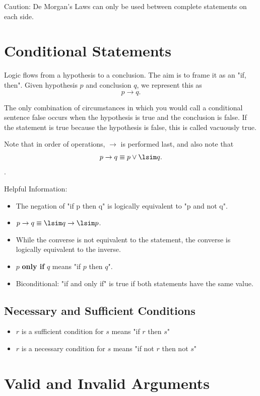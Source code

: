 \documentclass[a4paper]{report}
\begin{document}
Caution: De Morgan's Laws can only be used between complete statements on each side.

\section{Conditional Statements}

Logic flows from a hypothesis to a conclusion. The aim is to frame it as an "if, then". Given hypothesis $p$ and conclusion $q$, we represent this as \[
p \rightarrow q
.\] 

The only combination of circumstances in which you would call a conditional sentence false occurs when the hypothesis is true and the conclusion is false. If the statement is true because the hypothesis is false, this is called vacuously true.

Note that in order of operations, $\to $ is performed last, and also note that \[
p \to q \equiv p \lor \lsim q
.\].

Helpful Information:
\begin{itemize}
    \item The negation of "if p then q" is logically equivalent to "p and not q".
    \item $p \to q \equiv \lsim q \to \lsim p$.
    \item While the converse is not equivalent to the statement, the converse is logically equivalent to the inverse.
    \item $p$ \textbf{only if} $q$ means "if $p$ then $q$".
    \item Biconditional: "if and only if" is true if both statements have the same value.
\end{itemize}

\subsection{Necessary and Sufficient Conditions}

\begin{itemize}
    \item $r$ is a sufficient condition for $s$ means "if $r$ then $s$"
    \item $r$ is a necessary condition for $s$ means "if not $r$ then not $s$"
\end{itemize}

\section{Valid and Invalid Arguments}
\end{document}
